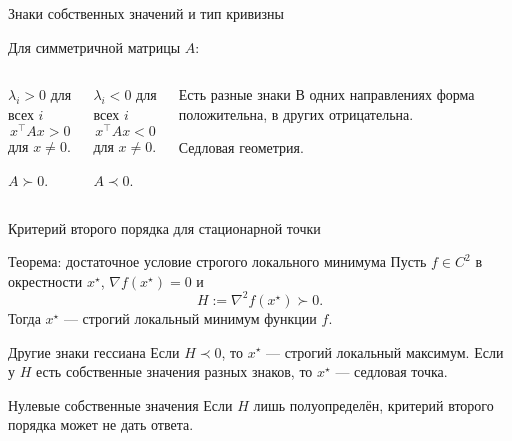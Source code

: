 \documentclass[aspectratio=169,10pt]{beamer}
\newcommand{\grad}{\nabla}
\newcommand{\Hess}{\nabla^2}
\begin{document}
\begin{frame}{Знаки собственных значений и тип кривизны}
\vspace{0.35em}

Для симметричной матрицы $A$:

\begin{columns}[T,onlytextwidth]
\begin{block}{$\lambda_i>0$ для всех $i$}
\[
 x^\top Ax>0
\]
для $x\ne0$.

$A\succ0$.
\end{block}

\begin{block}{$\lambda_i<0$ для всех $i$}
\[
 x^\top Ax<0
\]
для $x\ne0$.

$A\prec0$.
\end{block}

\begin{block}{Есть разные знаки}
В одних направлениях форма положительна, в других отрицательна.

Седловая геометрия.
\end{block}
\end{columns}

\end{frame}

\begin{frame}{Критерий второго порядка для стационарной точки}
\small
\vspace{0.15em}

\begin{block}{Теорема: достаточное условие строгого локального минимума}
Пусть $f\in C^2$ в окрестности $x^\star$, $\grad f(x^\star)=0$ и
\[
  H:=\Hess f(x^\star)\succ0.
\]
Тогда $x^\star$ --- строгий локальный минимум функции $f$.
\end{block}

\begin{block}{Другие знаки гессиана}
Если $H\prec0$, то $x^\star$ --- строгий локальный максимум.
Если у $H$ есть собственные значения разных знаков, то $x^\star$ --- седловая точка.
\end{block}

\begin{alertblock}{Нулевые собственные значения}
Если $H$ лишь полуопределён, критерий второго порядка может не дать ответа.
\end{alertblock}
\end{frame}
\end{document}
